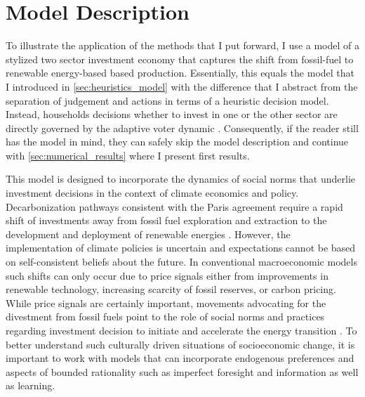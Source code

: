 \section{Model Description}
\label{sec:approx_Model_Description}

To illustrate the application of the methods that I put forward, I use a model of a stylized two sector investment economy that captures the shift from fossil-fuel to renewable energy-based based production. Essentially, this equals the model that I introduced in \cref{sec:heuristics_model} with the difference that I abstract from the separation of judgement and actions in terms of a heuristic decision model. Instead, households decisions whether to invest in one or the other sector are directly governed by the adaptive voter dynamic \citep{Holme2006a}.
Consequently, if the reader still has the model in mind, they can safely skip the model description and continue with \cref{sec:numerical_results} where I present first results.

This model is designed to incorporate the dynamics of social norms that underlie investment decisions in the context of climate economics and policy. Decarbonization pathways consistent with the Paris agreement require a rapid shift of investments away from fossil fuel exploration and extraction to the development and deployment of renewable energies \citep{IPCC2014}. However, the implementation of climate policies is uncertain and expectations cannot be based on self-consistent beliefs about the future.  In conventional macroeconomic models such shifts can only occur due to price signals either from improvements in renewable technology, increasing scarcity of fossil reserves, or carbon pricing. While price signals are certainly important, movements advocating for the divestment from fossil fuels point to the role of social norms and practices regarding investment decision to initiate and accelerate the energy transition \citep{Ans2013,Nyborg2016}. To better understand such culturally driven situations of socioeconomic change, it is important to work with models that can incorporate endogenous preferences and aspects of bounded rationality such as imperfect foresight and information as well as learning.
